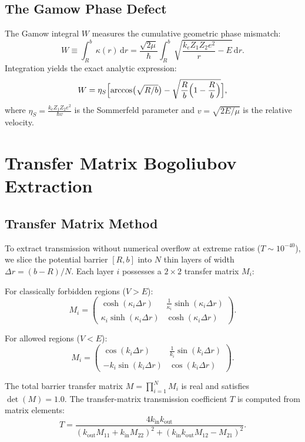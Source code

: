 \documentclass[11pt,a4paper]{article}
\theoremstyle{remark}
\newcommand{\dd}{\mathrm{d}}
\begin{document}
\subsection{The Gamow Phase Defect}
The Gamow integral $W$ measures the cumulative geometric phase mismatch:
\begin{equation}
W \equiv \int_{R}^{b} \kappa(r)\,\dd r = \frac{\sqrt{2\mu}}{\hbar}\int_{R}^{b}\sqrt{\frac{k_e Z_1 Z_2 e^2}{r} - E}\,\dd r.
\end{equation}
Integration yields the exact analytic expression:
\begin{equation}
W = \eta_S \Bigl[\arccos\bigl(\sqrt{R/b}\bigr) - \sqrt{\frac{R}{b}\Bigl(1 - \frac{R}{b}\Bigr)}\Bigr],
\end{equation}
where $\eta_S = \frac{k_e Z_1 Z_2 e^2}{\hbar v}$ is the Sommerfeld parameter and $v = \sqrt{2E/\mu}$ is the relative velocity.

\section{Transfer Matrix Bogoliubov Extraction}

\subsection{Transfer Matrix Method}
To extract transmission without numerical overflow at extreme ratios ($T \sim 10^{-40}$), we slice the potential barrier $[R, b]$ into $N$ thin layers of width $\Delta r = (b-R)/N$. Each layer $i$ possesses a $2\times 2$ transfer matrix $M_i$:

For classically forbidden regions ($V > E$):
\begin{equation}
M_i = \begin{pmatrix} \cosh(\kappa_i \Delta r) & \frac{1}{\kappa_i}\sinh(\kappa_i \Delta r) \\ \kappa_i \sinh(\kappa_i \Delta r) & \cosh(\kappa_i \Delta r) \end{pmatrix}.
\end{equation}

For allowed regions ($V < E$):
\begin{equation}
M_i = \begin{pmatrix} \cos(k_i \Delta r) & \frac{1}{k_i}\sin(k_i \Delta r) \\ -k_i \sin(k_i \Delta r) & \cos(k_i \Delta r) \end{pmatrix}.
\end{equation}

The total barrier transfer matrix $M = \prod_{i=1}^N M_i$ is real and satisfies $\det(M) = 1.0$. The transfer-matrix transmission coefficient $T$ is computed from matrix elements:
\begin{equation}
T = \frac{4 k_{\text{in}} k_{\text{out}}}{(k_{\text{out}} M_{11} + k_{\text{in}} M_{22})^2 + (k_{\text{in}} k_{\text{out}} M_{12} - M_{21})^2}.
\end{equation}
\end{document}
